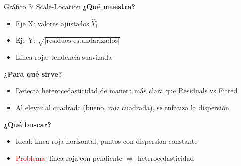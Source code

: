 \documentclass[aspectratio=169, 11pt]{beamer}
\begin{document}
\begin{frame}{Gráfico 3: Scale-Location}
\textbf{¿Qué muestra?}
\begin{itemize}
\item Eje X: valores ajustados $\hat{Y}_i$
\item Eje Y: $\sqrt{|\text{residuos estandarizados}|}$
\item Línea roja: tendencia suavizada
\end{itemize}

\vspace{0.3cm}
\textbf{¿Para qué sirve?}
\begin{itemize}
\item Detecta heterocedasticidad de manera más clara que Residuals vs Fitted
\item Al elevar al cuadrado (bueno, raíz cuadrada), se enfatiza la dispersión
\end{itemize}

\vspace{0.3cm}
\textbf{¿Qué buscar?}
\begin{itemize}
\item \textcolor{javerianalight}{Ideal}: línea roja horizontal, puntos con dispersión constante
\item \textcolor{red}{Problema}: línea roja con pendiente $\Rightarrow$ heterocedasticidad
\end{itemize}
\end{frame}
\end{document}
